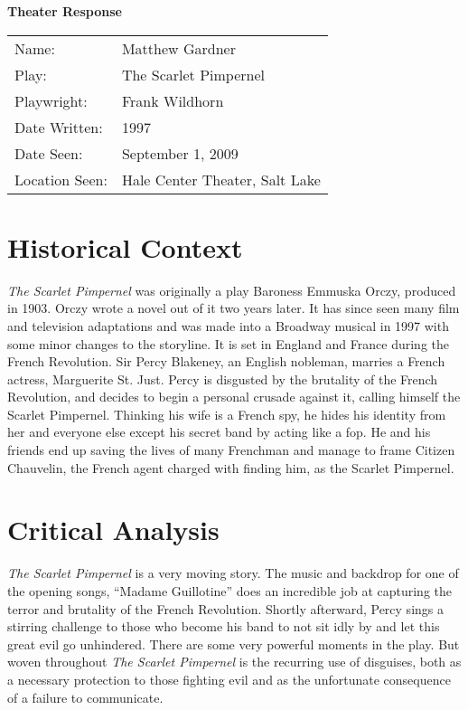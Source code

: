 \documentclass[onecolumn, 12pt]{article}
\title{}
\author{Matthew Gardner}
\date{}
\begin{document}
\textbf{Theater Response}

\begin{tabular}{ll}
  Name:&Matthew Gardner \\
  Play:&The Scarlet Pimpernel \\
  Playwright:&Frank Wildhorn \\
  Date Written:&1997 \\
  Date Seen:&September 1, 2009 \\
  Location Seen:&Hale Center Theater, Salt Lake \\
\end{tabular}

\section*{Historical Context}

\emph{The Scarlet Pimpernel} was originally a play Baroness Emmuska Orczy,
produced in 1903.  Orczy wrote a novel out of it two years later.  It has since
seen many film and television adaptations and was made into a Broadway musical
in 1997 with some minor changes to the storyline.  It is set in England and
France during the French Revolution.  Sir Percy Blakeney, an English nobleman,
marries a French actress, Marguerite St. Just.  Percy is disgusted by the
brutality of the French Revolution, and decides to begin a personal crusade
against it, calling himself the Scarlet Pimpernel.  Thinking his wife is a
French spy, he hides his identity from her and everyone else except his secret
band by acting like a fop.  He and his friends end up saving the lives of many
Frenchman and manage to frame Citizen Chauvelin, the French agent charged with
finding him, as the Scarlet Pimpernel.

\section*{Critical Analysis}

\emph{The Scarlet Pimpernel} is a very moving story.  The music and backdrop
for one of the opening songs, ``Madame Guillotine'' does an incredible job at
capturing the terror and brutality of the French Revolution.  Shortly
afterward, Percy sings a stirring challenge to those who become his band to not
sit idly by and let this great evil go unhindered.  There are some very powerful
moments in the play.  But woven throughout \emph{The Scarlet Pimpernel} is the
recurring use of disguises, both as a necessary protection to those fighting
evil and as the unfortunate consequence of a failure to communicate.
\end{document}
